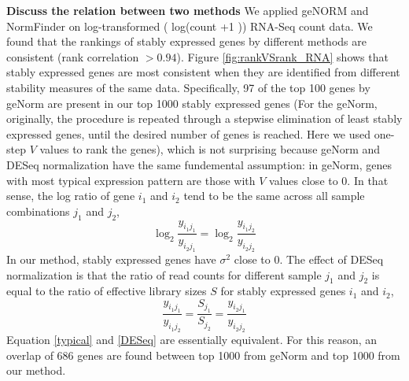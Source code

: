 \documentclass[11pt, a4paper]{article}
\begin{document}
\textbf{Discuss the relation between two methods}
 We applied geNORM \citep{vandesompele2002accurate} and NormFinder \citep{andersen2004normalization} on log-transformed ( log(count +1 )) RNA-Seq count data. We found that the rankings of stably expressed genes by different methods are consistent (rank correlation $> 0.94$). Figure \ref{fig:rankVSrank_RNA} shows that stably expressed genes are most consistent when they are identified from different stability measures of the same data.  Specifically, 97 of the top 100 genes by geNorm are present in our top 1000 stably expressed genes (For the geNorm, originally, the procedure is repeated through a stepwise elimination of least stably expressed genes, until the desired number of genes is reached. Here we used one-step $V$ values to rank the genes), which is not surprising because geNorm and DESeq normalization have the same fundemental assumption: in geNorm, genes with most typical expression pattern are those with $V$ values close to 0. In that sense, the log ratio of gene $i_1$ and $i_2$  tend to be the same across all sample combinations $j_1$ and $j_2$, 
 \begin{equation}\label{typical}
 \log_2\frac{y_{i_1j_1}}{y_{i_2j_1}} = \log_2\frac{y_{i_1j_2}}{y_{i_2j_2}}
 \end{equation}
 In our method, stably expressed genes have $\sigma^2$ close to 0.  The effect of DESeq normalization is that the ratio of read counts for different sample $j_1$ and $j_2$ is equal to the ratio of effective library sizes $S$ for stably expressed genes $i_1$ and $i_2$,
\begin{equation}\label{DESeq}
 \frac{y_{i_1j_1}}{y_{i_1j_2}} = \frac{S_{j_1}}{S_{j_2}}=\frac{y_{i_2j_1}}{y_{i_2j_2}} 
\end{equation}
 Equation \ref{typical} and \ref{DESeq} are essentially equivalent. For this reason, an overlap of 686 genes are found between top 1000 from geNorm and top 1000 from our method. 


\end{document}
